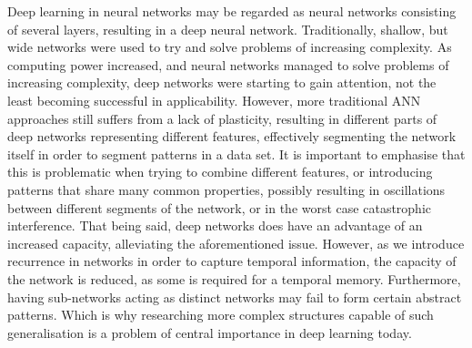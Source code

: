 
Deep learning in neural networks may be regarded as neural networks consisting of several layers, resulting in a deep neural network.
Traditionally, shallow, but wide networks were used to try and solve problems of increasing complexity.
As computing power increased, and neural networks managed to solve problems of increasing complexity, deep networks were starting to gain attention, not the least becoming successful in applicability. However, more traditional ANN approaches still suffers from a lack of plasticity, resulting in different parts of deep networks representing different features, effectively segmenting the network itself in order to segment patterns in a data set. It is important to emphasise that this is problematic when trying to combine different features, or introducing patterns that share many common properties, possibly resulting in oscillations between different segments of the network, or in the worst case catastrophic interference.
That being said, deep networks does have an advantage of an increased capacity, alleviating the aforementioned issue. However, as we introduce recurrence in networks in order to capture temporal information, the capacity of the network is reduced, as some is required for a temporal memory. Furthermore, having sub-networks acting as distinct networks may fail to form certain abstract patterns. Which is why researching more complex structures capable of such generalisation is a problem of central importance in deep learning today.
\\

